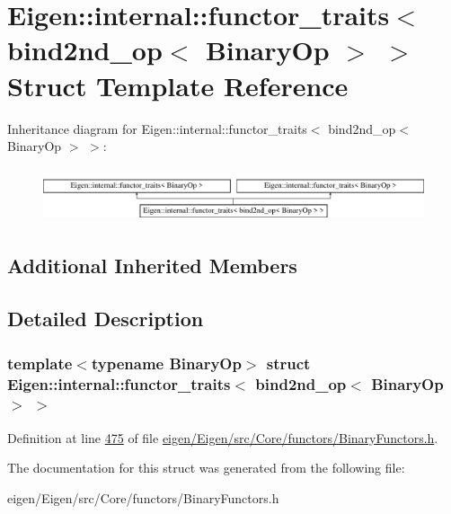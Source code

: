 \hypertarget{struct_eigen_1_1internal_1_1functor__traits_3_01bind2nd__op_3_01_binary_op_01_4_01_4}{}\section{Eigen\+:\+:internal\+:\+:functor\+\_\+traits$<$ bind2nd\+\_\+op$<$ Binary\+Op $>$ $>$ Struct Template Reference}
\label{struct_eigen_1_1internal_1_1functor__traits_3_01bind2nd__op_3_01_binary_op_01_4_01_4}
Inheritance diagram for Eigen\+:\+:internal\+:\+:functor\+\_\+traits$<$ bind2nd\+\_\+op$<$ Binary\+Op $>$ $>$\+:\begin{figure}[H]
\begin{center}
\leavevmode
\includegraphics[height=1.609195cm]{struct_eigen_1_1internal_1_1functor__traits_3_01bind2nd__op_3_01_binary_op_01_4_01_4}
\end{center}
\end{figure}
\subsection*{Additional Inherited Members}


\subsection{Detailed Description}
\subsubsection*{template$<$typename Binary\+Op$>$\newline
struct Eigen\+::internal\+::functor\+\_\+traits$<$ bind2nd\+\_\+op$<$ Binary\+Op $>$ $>$}



Definition at line \hyperlink{eigen_2_eigen_2src_2_core_2functors_2_binary_functors_8h_source_l00475}{475} of file \hyperlink{eigen_2_eigen_2src_2_core_2functors_2_binary_functors_8h_source}{eigen/\+Eigen/src/\+Core/functors/\+Binary\+Functors.\+h}.



The documentation for this struct was generated from the following file\+:\begin{DoxyCompactItemize}
\item 
eigen/\+Eigen/src/\+Core/functors/\+Binary\+Functors.\+h\end{DoxyCompactItemize}
